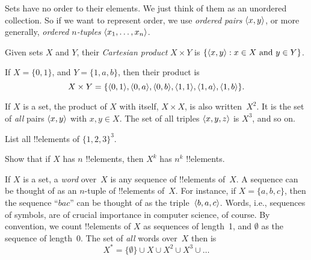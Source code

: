 \documentclass[../../../include/open-logic-section]{subfiles}
\begin{document}

\begin{explain}
Sets have no order to their elements. We just think of them as an
unordered collection. So if we want to represent order, we use
\emph{ordered pairs} $\langle x, y \rangle$, or more generally,
\emph{ordered $n$-tuples} $\langle x_1, \dots, x_n \rangle$.
\end{explain}

\begin{defn}
Given sets $X$ and $Y$, their \emph{Cartesian product} $X \times Y$ is
$\{ \langle x, y \rangle : x \in X \text{ and } y \in Y \}$.
\end{defn}

\begin{ex}
If $X = \{0, 1\}$, and $Y = \{1, a, b\}$, then their product is
\[
X \times Y = \{ \langle 0, 1 \rangle, \langle 0, a \rangle, \langle 0, b \rangle,
    \langle 1, 1 \rangle, \langle 1, a \rangle, \langle 1, b \rangle \}.
\]
\end{ex}

\begin{ex}
If $X$ is a set, the product of $X$ with itself, $X \times X$, is also
written~$X^2$. It is the set of \emph{all} pairs $\langle x, y \rangle$ with
$x, y \in X$.  The set of all triples $\langle x, y, z \rangle$ is $X^3$, and
so on.
\end{ex}

\begin{prob}
List all !!{element}s of $\{1, 2, 3\}^3$.
\end{prob}

\begin{prob}
Show that if $X$ has $n$ !!{element}s, then $X^k$ has $n^k$
!!{element}s.
\end{prob}

\begin{ex}
If $X$ is a set, a \emph{word} over~$X$ is any sequence of
!!{element}s of~$X$.  A sequence can be thought of as an $n$-tuple of
!!{element}s of~$X$. For instance, if $X = \{a, b, c\}$, then the
sequence ``$bac$'' can be thought of as the triple~$\langle b, a, c \rangle$.
Words, i.e., sequences of symbols, are of crucial importance in
computer science, of course.  By convention, we count !!{element}s of
$X$ as sequences of length~1, and $\emptyset$ as the sequence of
length~0.  The set of \emph{all} words over~$X$ then is
\[
X^* = \{\emptyset\} \cup X \cup X^2 \cup X^3 \cup \dots
\]
\end{ex}
\end{document}
